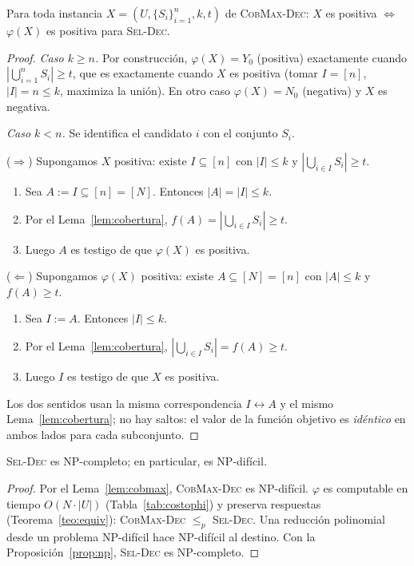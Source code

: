 \begin{teorema}\label{teo:equiv}
Para toda instancia $X=(U,\{S_i\}_{i=1}^n,k,t)$ de \textsc{CobMax-Dec}: $X$ es positiva $\iff$ $\varphi(X)$ es positiva para \textsc{Sel-Dec}.
\end{teorema}
\begin{proof}
\emph{Caso $k\ge n$.} Por construcción, $\varphi(X)=Y_0$ (positiva) exactamente cuando $|\bigcup_{i=1}^nS_i|\ge t$, que es exactamente cuando $X$ es positiva (tomar $I=[n]$, $|I|=n\le k$, maximiza la unión). En otro caso $\varphi(X)=N_0$ (negativa) y $X$ es negativa.

\emph{Caso $k<n$.} Se identifica el candidato $i$ con el conjunto $S_i$.

($\Rightarrow$) Supongamos $X$ positiva: existe $I\subseteq[n]$ con $|I|\le k$ y $|\bigcup_{i\in I}S_i|\ge t$.
\begin{enumerate}[label=(\arabic*)]
\item Sea $A:=I\subseteq[n]=[N]$. Entonces $|A|=|I|\le k$.
\item Por el Lema~\ref{lem:cobertura}, $f(A)=|\bigcup_{i\in I}S_i|\ge t$.
\item Luego $A$ es testigo de que $\varphi(X)$ es positiva.
\end{enumerate}

($\Leftarrow$) Supongamos $\varphi(X)$ positiva: existe $A\subseteq[N]=[n]$ con $|A|\le k$ y $f(A)\ge t$.
\begin{enumerate}[label=(\arabic*)]
\item Sea $I:=A$. Entonces $|I|\le k$.
\item Por el Lema~\ref{lem:cobertura}, $|\bigcup_{i\in I}S_i|=f(A)\ge t$.
\item Luego $I$ es testigo de que $X$ es positiva.
\end{enumerate}
Los dos sentidos usan la misma correspondencia $I\leftrightarrow A$ y el mismo Lema~\ref{lem:cobertura}; no hay saltos: el valor de la función objetivo es \emph{idéntico} en ambos lados para cada subconjunto.
\end{proof}

\begin{corolario}\label{cor:npc}
\textsc{Sel-Dec} es NP-completo; en particular, es NP-difícil.
\end{corolario}
\begin{proof}
Por el Lema~\ref{lem:cobmax}, \textsc{CobMax-Dec} es NP-difícil. $\varphi$ es computable en tiempo $O(N\cdot|U|)$ (Tabla~\ref{tab:costophi}) y preserva respuestas (Teorema~\ref{teo:equiv}): \textsc{CobMax-Dec} $\le_p$ \textsc{Sel-Dec}. Una reducción polinomial desde un problema NP-difícil hace NP-difícil al destino. Con la Proposición~\ref{prop:np}, \textsc{Sel-Dec} es NP-completo.
\end{proof}

